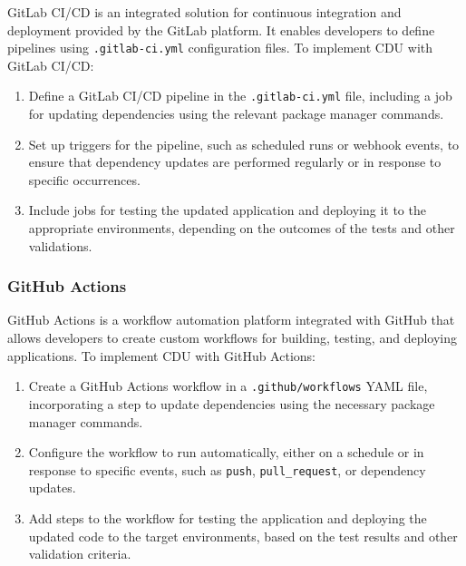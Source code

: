\documentclass[10pt]{article}
\begin{document}
GitLab CI/CD is an integrated solution for continuous integration and deployment provided by the GitLab platform. It enables developers to define pipelines using \texttt{.gitlab-ci.yml} configuration files. To implement CDU with GitLab CI/CD:

\begin{enumerate}

  \item Define a GitLab CI/CD pipeline in the \texttt{.gitlab-ci.yml} file, including a job for updating dependencies using the relevant package manager commands.

  \item Set up triggers for the pipeline, such as scheduled runs or webhook events, to ensure that dependency updates are performed regularly or in response to specific occurrences.

  \item Include jobs for testing the updated application and deploying it to the appropriate environments, depending on the outcomes of the tests and other validations.

\end{enumerate}

\subsubsection*{GitHub Actions}

GitHub Actions is a workflow automation platform integrated with GitHub that allows developers to create custom workflows for building, testing, and deploying applications. To implement CDU with GitHub Actions:

\begin{enumerate}

  \item Create a GitHub Actions workflow in a \texttt{.github/workflows} YAML file, incorporating a step to update dependencies using the necessary package manager commands.

  \item Configure the workflow to run automatically, either on a schedule or in response to specific events, such as \texttt{push}, \texttt{pull\_request}, or dependency updates.

  \item Add steps to the workflow for testing the application and deploying the updated code to the target environments, based on the test results and other validation criteria.

\end{enumerate}
\end{document}
